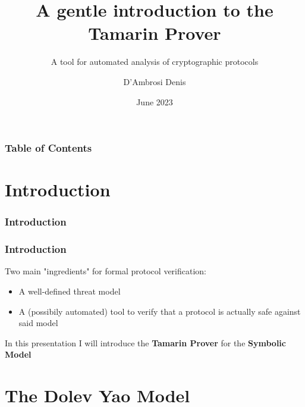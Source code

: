 \documentclass[aspectratio=169,t,xcolor=table]{beamer}
\begin{document}
\title[Inf UFG]{A gentle introduction to the Tamarin Prover}
\subtitle{A tool for automated analysis of cryptographic protocols}

\author{D'Ambrosi Denis}

\date{June 2023}
\frame[noframenumbering]{\titlepage}



\begin{frame}
    \frametitle{Table of Contents}
    \tableofcontents
\end{frame}

\section{Introduction}

\begin{frame}{}
    \frametitle{Introduction}
\end{frame}


\begin{frame}
    \frametitle{Introduction}

    \begin{block}{}
        Two main "ingredients" for formal protocol verification:

        \begin{itemize}
            \item A well-defined threat model
            \item A (possibily automated) tool to verify that a protocol is actually safe against said model
        \end{itemize}
    \end{block}

    In this presentation I will introduce the \textbf{Tamarin Prover} for the \textbf{Symbolic Model}
\end{frame}

\section{The Dolev Yao Model}
\end{document}
